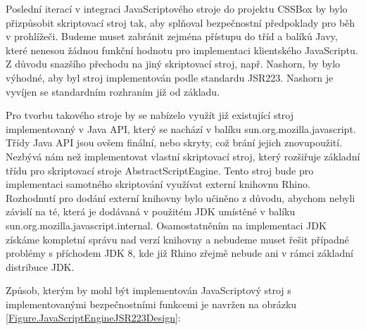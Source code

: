 Poslední iterací v integraci JavaScriptového stroje do projektu CSSBox by bylo přizpůsobit skriptovací stroj tak, aby splňoval bezpečnostní předpoklady pro běh v prohlížeči. Budeme muset zabránit zejména přístupu do tříd a balíků Javy, které nenesou žádnou funkční hodnotu pro implementaci klientského JavaScriptu. Z důvodu snazšího přechodu na jiný skriptovací stroj, např. Nashorn, by bylo výhodné, aby byl stroj implementován podle standardu JSR223. Nashorn je vyvíjen se standardním rozhraním již od základu.

Pro tvorbu takového stroje by se nabízelo využít již existující stroj implementovaný v Java API, který se nachází v balíku sun.org.mozilla.javascript. Třídy Java API jsou ovšem finální, nebo skryty, což brání jejich znovupoužití. Nezbývá nám než implementovat vlastní skriptovací stroj, který rozšiřuje základní třídu pro skriptovací stroje AbstractScriptEngine. Tento stroj bude pro implementaci samotného skriptování využívat externí knihovnu Rhino. Rozhodnutí pro dodání externí knihovny bylo učiněno z důvodu, abychom nebyli závislí na té, která je dodávaná v použitém JDK umístěné v balíku sun.org.mozilla.javascript.internal. Osamostatněním na implementaci JDK získáme kompletní správu nad verzí knihovny a nebudeme muset řešit případné problémy s příchodem JDK 8, kde již Rhino zřejmě nebude ani v rámci základní distribuce JDK.

Způsob, kterým by mohl být implementován JavaScriptový stroj s implementovanými bezpečnostními funkcemi je navržen na obrázku \ref{Figure.JavaScriptEngineJSR223Design}:

